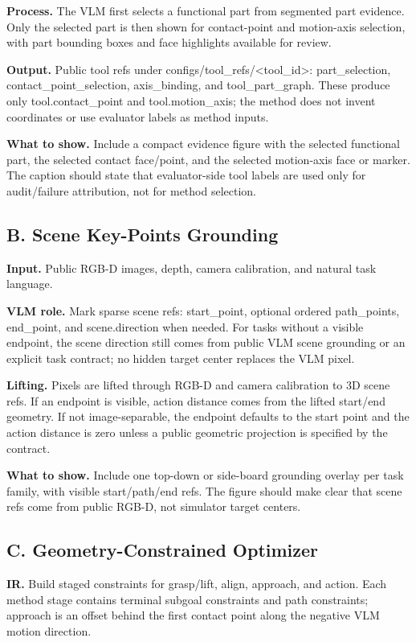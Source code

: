 \documentclass[journal]{IEEEtran}
\begin{document}
\textbf{Process.} The VLM first selects a functional part from segmented part
evidence. Only the selected part is then shown for contact-point and motion-axis
selection, with part bounding boxes and face highlights available for review.

\textbf{Output.} Public tool refs under configs/tool\_refs/\textless tool\_id\textgreater:
part\_selection, contact\_point\_selection, axis\_binding, and tool\_part\_graph.
These produce only tool.contact\_point and tool.motion\_axis; the method does
not invent coordinates or use evaluator labels as method inputs.

\textbf{What to show.} Include a compact evidence figure with the selected
functional part, the selected contact face/point, and the selected motion-axis
face or marker. The caption should state that evaluator-side tool labels are
used only for audit/failure attribution, not for method selection.

\subsection{B. Scene Key-Points Grounding}
\textbf{Input.} Public RGB-D images, depth, camera calibration, and natural task
language.

\textbf{VLM role.} Mark sparse scene refs: start\_point, optional ordered
path\_points, end\_point, and scene.direction when needed. For tasks without a
visible endpoint, the scene direction still comes from public VLM scene
grounding or an explicit task contract; no hidden target center replaces the
VLM pixel.

\textbf{Lifting.} Pixels are lifted through RGB-D and camera calibration to
3D scene refs. If an endpoint is visible, action distance comes from the lifted
start/end geometry. If not image-separable, the endpoint defaults to the start
point and the action distance is zero unless a public geometric projection is
specified by the contract.

\textbf{What to show.} Include one top-down or side-board grounding overlay per
task family, with visible start/path/end refs. The figure should make clear that
scene refs come from public RGB-D, not simulator target centers.

\subsection{C. Geometry-Constrained Optimizer}
\textbf{IR.} Build staged constraints for grasp/lift, align, approach, and
action. Each method stage contains terminal subgoal constraints and path
constraints; approach is an offset behind the first contact point along the
negative VLM motion direction.
\end{document}
